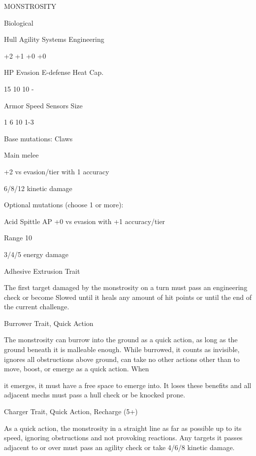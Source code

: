        MONSTROSITY 

       Biological 

       Hull       Agility      Systems       Engineering 

       +2         +1           +0            +0 

       HP         Evasion      E-defense     Heat Cap. 

       15         10           10            - 

       Armor      Speed        Sensors       Size 

       1          6            10            1-3 

Base mutations:  
Claws
 
Main melee
 
+2 vs evasion/tier with 1 accuracy
 
6/8/12 kinetic damage
 

Optional mutations (choose 1 or more):
 

Acid Spittle  
AP  
+0 vs evasion with +1 accuracy/tier
 
Range 10
 
3/4/5 energy damage
 

Adhesive Extrusion  
Trait
 
The first target damaged by the monstrosity on a turn must pass an engineering check or  
become Slowed until it heals any amount of hit points or until the end of the current challenge.
 

Burrower  
Trait, Quick Action
 
The monstrosity can burrow into the ground as a quick action, as long as the ground beneath it  
is malleable enough. While burrowed, it counts as invisible, ignores all obstructions above  
ground, can take no other actions other than to move, boost, or emerge as a quick action. When  

                                                                                                           


it emerges, it must have a free space to emerge into. It loses these benefits and all adjacent  
mechs must pass a hull check or be knocked prone.
 

Charger  
Trait, Quick Action, Recharge (5+)
 
As a quick action, the monstrosity in a straight line as far as possible up to its speed, ignoring  
obstructions and not provoking reactions. Any targets it passes adjacent to or over must pass an  
agility check or take 4/6/8 kinetic damage.
 


